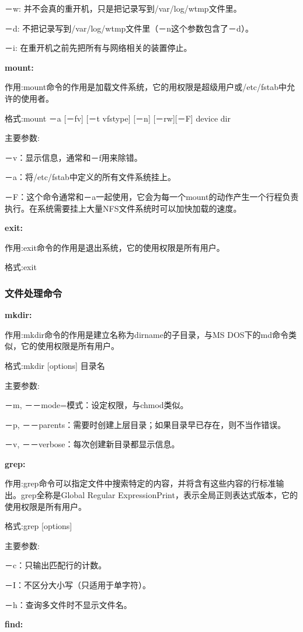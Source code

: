 －w: 并不会真的重开机，只是把记录写到/var/log/wtmp文件里。

－d: 不把记录写到/var/log/wtmp文件里（－n这个参数包含了－d）。

－i: 在重开机之前先把所有与网络相关的装置停止。

\textbf{mount:}

作用:mount命令的作用是加载文件系统，它的用权限是超级用户或/etc/fstab中允许的使用者。

格式:mount －a [－fv] [－t vfstype] [－n] [－rw][－F] device dir

主要参数:

－v：显示信息，通常和－f用来除错。

－a：将/etc/fstab中定义的所有文件系统挂上。

－F：这个命令通常和－a一起使用，它会为每一个mount的动作产生一个行程负责执行。在系统需要挂上大量NFS文件系统时可以加快加载的速度。

\textbf{exit:}

作用:exit命令的作用是退出系统，它的使用权限是所有用户。

格式:exit

\subsubsection{文件处理命令}

\textbf{mkdir:}

作用:mkdir命令的作用是建立名称为dirname的子目录，与MS DOS下的md命令类似，它的使用权限是所有用户。

格式:mkdir [options] 目录名

主要参数:

－m, －－mode=模式：设定权限，与chmod类似。

－p, －－parents：需要时创建上层目录；如果目录早已存在，则不当作错误。

－v, －－verbose：每次创建新目录都显示信息。

\textbf{grep:}

作用:grep命令可以指定文件中搜索特定的内容，并将含有这些内容的行标准输出。grep全称是Global Regular ExpressionPrint，表示全局正则表达式版本，它的使用权限是所有用户。

格式:grep [options]

主要参数:

－c：只输出匹配行的计数。

－I：不区分大小写（只适用于单字符）。

－h：查询多文件时不显示文件名。

\textbf{find:}

